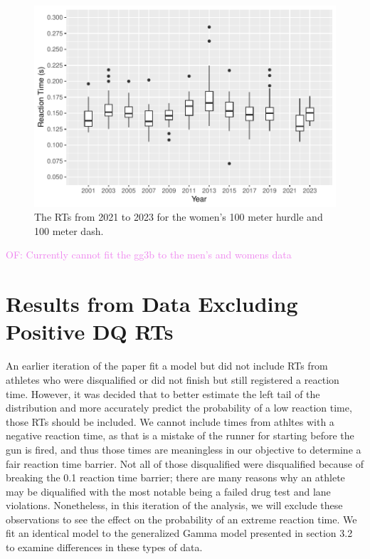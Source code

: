 \documentclass[12pt, letterpaper]{article}
\newcommand{\of}[1]{\textcolor{violet}{OF: #1}}
\begin{document}
\begin{figure}[tbp]
  \centering
  \includegraphics[width=\textwidth]{WomensBoxplot}
  \caption{The RTs from 2021 to 2023 for the women's 100 meter hurdle
  and 100 meter dash.}
  \label{fig:WomensBoxplot}
\end{figure}


\of{Currently cannot fit the gg3b to the men's and womens data}


\section{Results from Data Excluding Positive DQ RTs}

An earlier iteration of the paper fit a model but did not include RTs from
athletes who were disqualified or did not finish but still registered a reaction
time.  However, it was decided that to better estimate the left tail of the
distribution and more accurately predict the probability of a low reaction time,
those RTs should be included.  We cannot include times from athltes with a
negative reaction time, as that is a mistake of the runner for starting before
the gun is fired, and thus those times are meaningless in our objective to
determine a fair reaction time barrier.  Not all of those disqualified were
disqualified because of breaking the 0.1 reaction time barrier; there are many
reasons why an athlete may be diqualified with the most notable being a failed
drug test and lane violations.  Nonetheless, in this iteration of the analysis,
we will exclude these observations to see the effect on the probability of an
extreme reaction time.  We fit an identical model to the generalized Gamma model
presented in section 3.2 to examine differences in these types of data.
\end{document}
